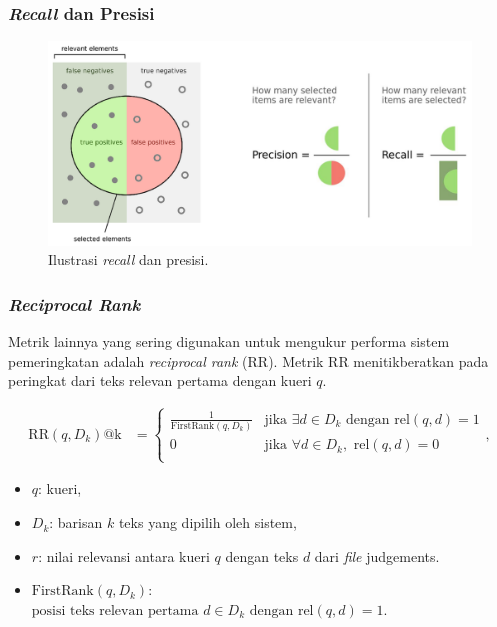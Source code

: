 \documentclass{beamer}
\newcommand{\f}[1]{\textit{#1}}
\begin{document}
\begin{frame}
    \frametitle{\f{Recall} dan Presisi}
    \begin{figure}[!ht]
        \centering
        \includegraphics[width=1\textwidth]{assets/pics/recall-presisi.png}
        \caption{Ilustrasi \f{recall} dan presisi.}
        \label{fig:recall-precision}
    \end{figure}
\end{frame}

\begin{frame}
    \frametitle{\f{Reciprocal Rank}}
    Metrik lainnya yang sering digunakan untuk mengukur performa sistem pemeringkatan adalah \f{reciprocal rank} (RR). Metrik RR menitikberatkan pada peringkat dari teks relevan pertama dengan kueri $q$.

        \begin{align*}
            \text{RR}(q, D_k)\text{@k} &= \begin{cases}
                \frac{1}{\text{FirstRank}(q, D_k)} & \text{jika } \exists d \in D_k \text{ dengan } \text{rel}(q, d) = 1 \\        
                0 & \text{jika } \forall d \in D_k, \text{ rel}(q, d) = 0 \\
                \end{cases},
        \end{align*}
        
        \begin{itemize}
            \item $q$: kueri,
            \item $D_k$: barisan $k$ teks yang dipilih oleh sistem,
            \item $r$: nilai relevansi antara kueri $q$ dengan teks $d$ dari \f{file} judgements.
            \item $ \text{FirstRank}(q,D_k)$: $\text{posisi teks relevan pertama } d\in D_k \text{ dengan } \text{rel}(q, d) = 1. $
        \end{itemize}
\end{frame}
\end{document}
